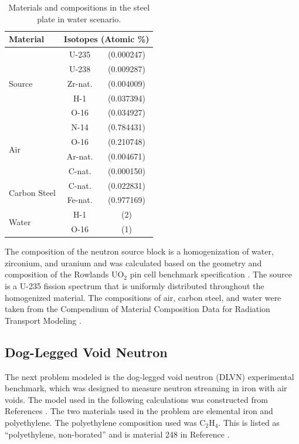 \documentclass{article} %
\begin{document}
\begin{table}[!htb]
\centering
\caption{Materials and compositions in the steel plate in water scenario.}
\label{steel-mat}
\begin{tabular}{l|cc}
Material & \multicolumn{2}{c}{Isotopes (Atomic \%)} \\ \hline
\multirow{5}{*}{Source}   & U-235   & (0.000247) \\
                          & U-238   & (0.009287) \\
                          & Zr-nat. & (0.004009) \\
                          & H-1     & (0.037394) \\
                          & O-16    & (0.034927) \\ \hline
\multirow{4}{*}{Air}      & N-14    & (0.784431) \\
                          & O-16    & (0.210748) \\
                          & Ar-nat. & (0.004671) \\
                          & C-nat.  & (0.000150) \\ \hline
\multirow{2}{*}{Carbon Steel} & C-nat.  & (0.022831) \\
                              & Fe-nat. & (0.977169) \\ \hline
\multirow{2}{*}{Water}        & H-1     & (2)        \\
                              & O-16    & (1)        \\
\end{tabular}
\end{table}

The composition of the neutron source block is a homogenization of water,
zirconium, and uranium and was calculated based on the geometry and composition
of the Rowlands UO$_2$ pin cell benchmark specification \cite{pincell}. The
source is a U-235 fission 
spectrum that is uniformly distributed throughout the homogenized material. The
compositions of air, carbon steel, and water were taken from the Compendium of 
Material Composition Data for Radiation Transport Modeling \cite{pnnl}.

\subsection{Dog-Legged Void Neutron}

The next problem modeled is the dog-legged void neutron (DLVN) experimental 
benchmark, which was designed to measure neutron streaming in iron with air
voids. The model used in the following calculations was constructed from
References \cite{sw-dlvn,j-dlvn,dlvn1991}. The two materials used in the
problem are elemental iron and polyethylene. The polyethylene composition used
was C$_2$H$_4$. This is listed as ``polyethylene, non-borated'' and is material
248 in Reference \cite{pnnl}. 
\end{document}
